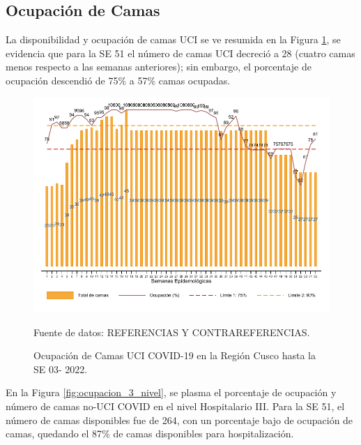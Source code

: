 \documentclass[12pt,a4paper,openany]{book}
\begin{document}
\clearpage
\subsection*{Ocupación de Camas}
\noindent La disponibilidad y ocupación de camas UCI se ve resumida en la Figura \ref{fig:ocupacion_uci}, se evidencia que para la SE 51 el número de camas UCI decreció a 28 (cuatro camas menos respecto a las semanas anteriores); sin embargo,  el porcentaje de ocupación descendió de 75$\%$ a 57$\%$ camas ocupadas.

\begin{figure}[h]
	\caption{Ocupación de Camas UCI COVID-19 en la Región Cusco hasta la SE 03- 2022.}\label{fig:ocupacion_uci}
	\begin{center}
		\includegraphics[width=0.95\linewidth]{../figuras/uci.pdf}
	\end{center}
	{\footnotesize {Fuente de datos: REFERENCIAS Y CONTRAREFERENCIAS.}}
\end{figure}
\cleardoublepage

En la Figura \ref{fig:ocupacion_3_nivel}, se plasma el porcentaje de ocupación y número de camas no-UCI COVID en el nivel Hospitalario III. Para la SE 51, el número de camas disponibles fue de 264, con un porcentaje bajo de ocupación de camas, quedando el 87$\%$ de camas disponibles para hospitalización. 
  
\end{document}
